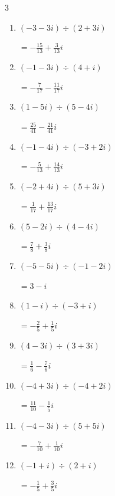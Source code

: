 \begin{multicols}{3}
\begin{enumerate}
  \item $\displaystyle (-3-3i)\div(2+3i)$

        $\displaystyle =-\frac{15}{13}+\frac{3}{13}i$

  \item $\displaystyle (-1-3i)\div(4+i)$

        $\displaystyle =-\frac{7}{17}-\frac{11}{17}i$

  \item $\displaystyle (1-5i)\div(5-4i)$

        $\displaystyle =\frac{25}{41}-\frac{21}{41}i$

  \item $\displaystyle (-1-4i)\div(-3+2i)$

        $\displaystyle =-\frac{5}{13}+\frac{14}{13}i$

  \item $\displaystyle (-2+4i)\div(5+3i)$

        $\displaystyle =\frac{1}{17}+\frac{13}{17}i$

\columnbreak %

  \item $\displaystyle (5-2i)\div(4-4i)$

        $\displaystyle =\frac{7}{8}+\frac{3}{8}i$

  \item $\displaystyle (-5-5i)\div(-1-2i)$

        $\displaystyle =3-i$

  \item $\displaystyle (1-i)\div(-3+i)$

        $\displaystyle =-\frac{2}{5}+\frac{1}{5}i$

  \item $\displaystyle (4-3i)\div(3+3i)$

        $\displaystyle =\frac{1}{6}-\frac{7}{6}i$

  \item $\displaystyle (-4+3i)\div(-4+2i)$

        $\displaystyle =\frac{11}{10}-\frac{1}{5}i$

  \item $\displaystyle (-4-3i)\div(5+5i)$

        $\displaystyle =-\frac{7}{10}+\frac{1}{10}i$

  \item $\displaystyle (-1+i)\div(2+i)$

        $\displaystyle =-\frac{1}{5}+\frac{3}{5}i$


\end{enumerate}
\end{multicols}

